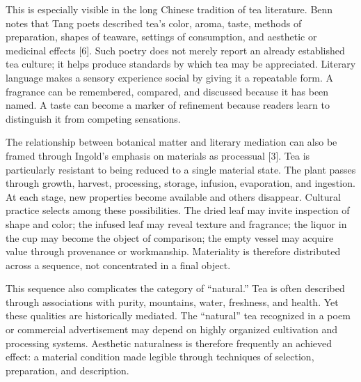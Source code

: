 \documentclass[11pt,a4paper]{article}
\begin{document}
This is especially visible in the long Chinese tradition of tea literature. Benn notes that Tang poets described tea's color, aroma, taste, methods of preparation, shapes of teaware, settings of consumption, and aesthetic or medicinal effects [6]. Such poetry does not merely report an already established tea culture; it helps produce standards by which tea may be appreciated. Literary language makes a sensory experience social by giving it a repeatable form. A fragrance can be remembered, compared, and discussed because it has been named. A taste can become a marker of refinement because readers learn to distinguish it from competing sensations.

The relationship between botanical matter and literary mediation can also be framed through Ingold's emphasis on materials as processual [3]. Tea is particularly resistant to being reduced to a single material state. The plant passes through growth, harvest, processing, storage, infusion, evaporation, and ingestion. At each stage, new properties become available and others disappear. Cultural practice selects among these possibilities. The dried leaf may invite inspection of shape and color; the infused leaf may reveal texture and fragrance; the liquor in the cup may become the object of comparison; the empty vessel may acquire value through provenance or workmanship. Materiality is therefore distributed across a sequence, not concentrated in a final object.

This sequence also complicates the category of ``natural.'' Tea is often described through associations with purity, mountains, water, freshness, and health. Yet these qualities are historically mediated. The ``natural'' tea recognized in a poem or commercial advertisement may depend on highly organized cultivation and processing systems. Aesthetic naturalness is therefore frequently an achieved effect: a material condition made legible through techniques of selection, preparation, and description.
\end{document}
